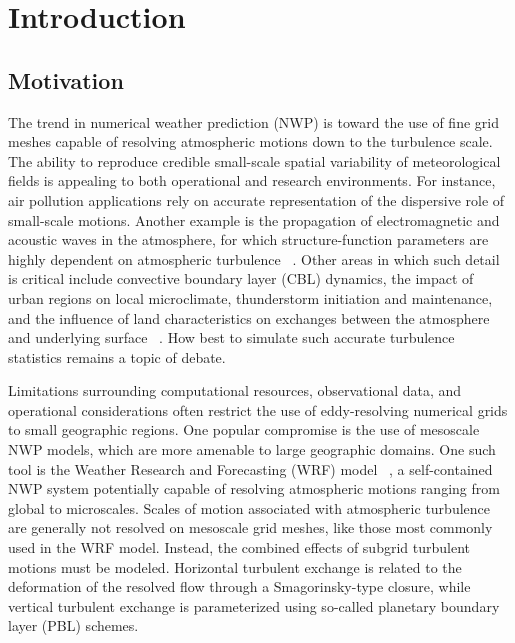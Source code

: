 
\chapter{Introduction}
\label{intro-1}

\section{Motivation}
\label{motivation-11}

The trend in numerical weather prediction (NWP) is toward the use of fine grid meshes capable of resolving atmospheric motions down to the turbulence scale. The ability to reproduce credible small-scale spatial variability of meteorological fields is appealing to both operational and research environments. For instance, air pollution applications rely on accurate representation of the dispersive role of small-scale motions. Another example is the propagation of electromagnetic and acoustic waves in the atmosphere, for which structure-function parameters are highly dependent on atmospheric turbulence ~\citep{Wilson2012b}. Other areas in which such detail is critical include convective boundary layer (CBL) dynamics, the impact of urban regions on local microclimate, thunderstorm initiation and maintenance, and the influence of land characteristics on exchanges between the atmosphere and underlying surface ~\citep{Talbot2012}. How best to simulate such accurate turbulence statistics remains a topic of debate.

Limitations surrounding computational resources, observational data, and operational considerations often restrict the use of eddy-resolving numerical grids to small geographic regions. One popular compromise is the use of mesoscale NWP models, which are more amenable to large geographic domains. One such tool is the Weather Research and Forecasting (WRF) model ~\citep{Skamarock}, a self-contained NWP system potentially capable of resolving atmospheric motions ranging from global to microscales. Scales of motion associated with atmospheric turbulence are generally not resolved on mesoscale grid meshes, like those most commonly used in the WRF model. Instead, the combined effects of subgrid turbulent motions must be modeled. Horizontal turbulent exchange is related to the deformation of the resolved flow through a Smagorinsky-type closure, while vertical turbulent exchange is parameterized using so-called planetary boundary layer (PBL) schemes. 

